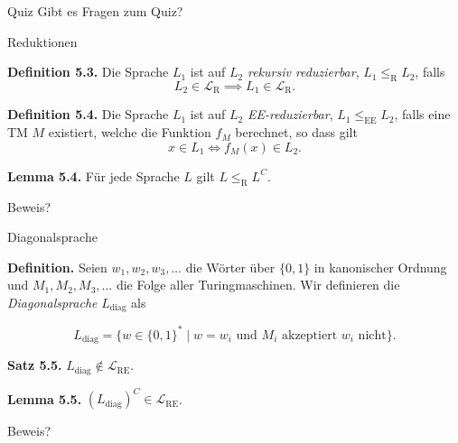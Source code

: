 \documentclass[11pt,aspectratio=169]{beamer}
\begin{document}
\begin{frame}{Quiz}
    Gibt es Fragen zum Quiz?
\end{frame}

\begin{frame}{Reduktionen}

    \justifying

    \textbf{Definition 5.3.}
    Die Sprache \(L_1\) ist auf \(L_2\) \textit{rekursiv reduzierbar},
    \(L_1 \le_{\text{R}} L_2\), falls
    \[
        L_2 \in \mathcal L_{\text{R}} \implies L_1 \in \mathcal L_{\text{R}}. 
    \]

    \vspace{1em}

    \textbf{Definition 5.4.}
    Die Sprache \(L_1\) ist auf \(L_2\) \textit{EE-reduzierbar},
    \(L_1 \le_{\text{EE}} L_2\), falls eine TM \(M\) existiert,
    welche die Funktion \(f_M\) berechnet, so dass gilt
    \[
        x \in L_1 \iff f_M(x) \in L_2.
    \]

    \textbf{Lemma 5.4.}
    Für jede Sprache \(L\) gilt \(L \le_{\text{R}} L^C\).

    \vspace{1em}

    Beweis?
\end{frame}

\begin{frame}{Diagonalsprache}

    \justifying

    \textbf{Definition.}
    Seien \(w_1, w_2, w_3, \ldots\) die Wörter über \(\{0, 1\}\) in kanonischer Ordnung
    und \(M_1, M_2, M_3, \ldots\) die Folge aller Turingmaschinen. Wir definieren die
    \textit{Diagonalsprache} \(L_{\text{diag}}\) als

    \[
        L_{\text{diag}} =
        \{ w \in \{0, 1\}^* \mid w = w_i \text{ und } M_i \text{ akzeptiert } w_i \text{ nicht} \}.
    \]

    \vspace{1em}

    \textbf{Satz 5.5.} \(L_{\text{diag}} \not\in \mathcal L_{\text{RE}}\).

    \vspace{1em}

    \textbf{Lemma 5.5.} \((L_{\text{diag}})^C \in \mathcal L_{\text{RE}}\).

    \vspace{1em}

    Beweis?
\end{frame}
\end{document}
